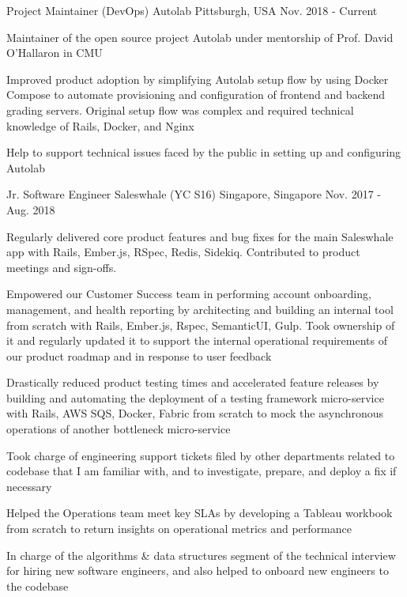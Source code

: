 \begin{cventries}
  \cventry
  {Project Maintainer (DevOps)} %
    {Autolab} %
    {Pittsburgh, USA} %
    {Nov. 2018 - Current} %
    {
      \begin{cvitems} %
      \item {Maintainer of the open source project Autolab under mentorship of Prof. David O'Hallaron in CMU}
      \item {Improved product adoption by simplifying Autolab setup flow by using Docker Compose to automate provisioning and configuration of frontend and backend grading servers. Original setup flow was complex and required technical knowledge of Rails, Docker, and Nginx}
      \item {Help to support technical issues faced by the public in setting up and configuring Autolab}
      \end{cvitems}
    }

  \cventry
    {Jr. Software Engineer} %
    {Saleswhale (YC S16)} %
    {Singapore, Singapore} %
    {Nov. 2017 - Aug. 2018} %
    {
      \begin{cvitems} %
      \item { Regularly delivered core product features and bug fixes for the main Saleswhale app with Rails, Ember.js, RSpec, Redis, Sidekiq. Contributed to product meetings and sign-offs.}
      \item { Empowered our Customer Success team in performing account onboarding, management, and health reporting by architecting and building an internal tool from scratch with Rails, Ember.js, Rspec, SemanticUI, Gulp. Took ownership of it and regularly updated it to support the internal operational requirements of our product roadmap and in response to user feedback}
      \item { Drastically reduced product testing times and accelerated feature releases by building and automating the deployment of a testing framework micro-service with Rails, AWS SQS, Docker, Fabric from scratch to mock the asynchronous operations of another bottleneck micro-service}
      \item { Took charge of engineering support tickets filed by other departments related to codebase that I am familiar with, and to investigate, prepare, and deploy a fix if necessary}
      \item { Helped the Operations team meet key SLAs by developing a Tableau workbook from scratch to return insights on operational metrics and performance }
      \item { In charge of the algorithms \& data structures segment of the technical interview for hiring new software engineers, and also helped to onboard new engineers to the codebase}
      \end{cvitems}
    }


\end{cventries}

